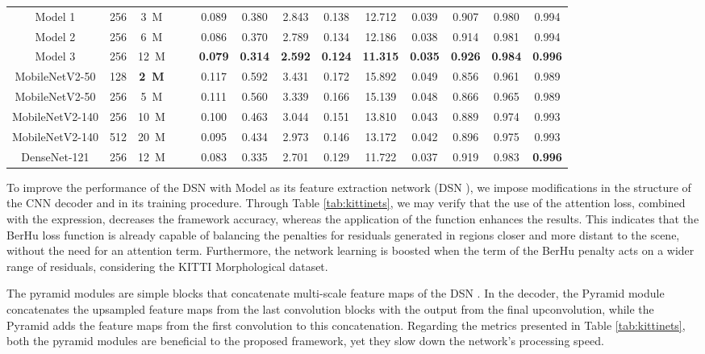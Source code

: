 \documentclass[5p]{elsarticle}
\begin{document}
\begin{table*}[]
{\begin{tabular}{c|c|c|c|c|cccccc|ccc}
Model 1 & 256 & 3\ M &  &  & 0.089 & 0.380 & 2.843 & 0.138 & 12.712 & 0.039 & 0.907 & 0.980 & 0.994 \\
Model 2 & 256 & 6\ M &  &  & 0.086 & 0.370 & 2.789 & 0.134 & 12.186 & 0.038 & 0.914 & 0.981 & 0.994 \\
Model 3 & 256 & 12\ M &  &  & \textbf{0.079} & \textbf{0.314} & \textbf{2.592} & \textbf{0.124} & \textbf{11.315} & \textbf{0.035} & \textbf{0.926} & \textbf{0.984} & \textbf{0.996}\\
MobileNetV2-50 & 128 &\textbf{2\ M} &  &  & 0.117 & 0.592 & 3.431 & 0.172 & 15.892 & 0.049 & 0.856 & 0.961 & 0.989 \\
MobileNetV2-50 & 256 & 5\ M &  &  & 0.111 & 0.560 & 3.339 & 0.166 & 15.139 & 0.048 & 0.866 & 0.965 & 0.989 \\
MobileNetV2-140 & 256 & 10\ M &  &  & 0.100 & 0.463 & 3.044 & 0.151 & 13.810 & 0.043 & 0.889 & 0.974 & 0.993 \\
MobileNetV2-140 & 512 & 20\ M &  &  & 0.095 & 0.434 & 2.973 & 0.146 & 13.172 & 0.042 & 0.896 & 0.975 & 0.993 \\
DenseNet-121 & 256 & 12\ M &  &  & 0.083 & 0.335 & 2.701 & 0.129 & 11.722 & 0.037 & 0.919 & 0.983 & \textbf{0.996} \\\hline
\end{tabular}
}
\end{table*}

To improve the performance of the DSN with Model  as its feature extraction network (DSN ), we impose modifications in the structure of the CNN decoder and in its training procedure. Through Table \ref{tab:kittinets}, we may verify that the use of the attention loss, combined with the  expression, decreases the framework accuracy, whereas the application of the  function enhances the results. This indicates that the BerHu loss function is already capable of balancing the penalties for residuals generated in regions closer and more distant to the scene, without the need for an attention term. Furthermore, the network learning is boosted when the term  of the BerHu penalty acts on a wider range of residuals, considering the KITTI Morphological dataset.

The pyramid modules are simple blocks that concatenate multi-scale feature maps of the DSN . In the decoder, the Pyramid module concatenates the upsampled feature maps from the last  convolution blocks with the output from the final upconvolution, while the Pyramid adds the feature maps from the first convolution to this concatenation. Regarding the metrics presented in Table \ref{tab:kittinets}, both the pyramid modules are beneficial to the proposed framework, yet they slow down the network's processing speed.
\end{document}
